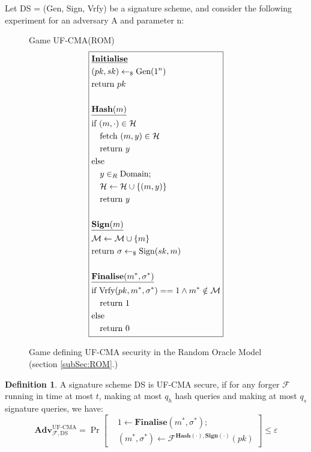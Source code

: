 \documentclass[]{final_report}
\theoremstyle{definition}
\newtheorem{definition}{Definition}[chapter]
\begin{document}
Let DS = (Gen, Sign, Vrfy) be a signature scheme, and consider the following experiment for an adversary A and parameter n:
\begin{figure}[H]
\centering
\hfill Game UF-CMA(ROM)\hfill\phantom{} 
\[
\boxed{
\begin{aligned}
&\underline{\textbf{\text{Initialise}}} \\
&(pk, sk) \leftarrow_\$ \text{Gen}(1^n) \\
&\text{return } pk \\
\\
&\underline{\textbf{\text{Hash}}(m)} \\
&\text{if } (m, \cdot) \in \mathcal{H} \\
&\quad \text{fetch } (m, y) \in \mathcal{H} \\
&\quad \text{return } y \\
&\text{else} \\
&\quad y \in_{R} \text{Domain}; \\
&\quad \mathcal{H} \leftarrow \mathcal{H} \cup\{(m, y)\} \\
&\quad \text{return } y \\
\\
&\underline{\textbf{\text{Sign}}(m)} \\
&\mathcal{M} \leftarrow \mathcal{M} \cup\{m\} \\
&\text{return } \sigma \leftarrow_{\$} \text{Sign}(sk, m) \\
\\
&\underline{\textbf{\text{Finalise}}(m^*, \sigma^*)} \\
&\text{if Vrfy}(pk, m^*, \sigma^*) == 1 \land m^* \notin \mathcal{M} \\
&\quad \text{return } 1 \\
&\text{else} \\
&\quad \text{return } 0
\end{aligned}
}
\]
\caption{Game defining UF-CMA security in the Random Oracle Model (section \ref{subSec:ROM}.)}
\label{fig:crypto_game}
\end{figure}
\begin{definition}
A signature scheme DS is UF-CMA secure, if for any forger $\mathcal{F}$ running in time at most $t$, making at most $q_h$ hash queries and making at most $q_s$ signature queries, we have:
\[
\textbf{Adv}_{\mathcal{F},\text{DS}}^{\text{UF-CMA}} = \Pr \left[ \begin{aligned} &1 \leftarrow \textbf{Finalise}(m^*, \sigma^*); \\ &(m^*, \sigma^*) \leftarrow \mathcal{F}^{\textbf{Hash}(\cdot),\textbf{Sign}(\cdot)}(pk) \end{aligned} \right] \leq \varepsilon
\]
\end{definition}
\end{document}

